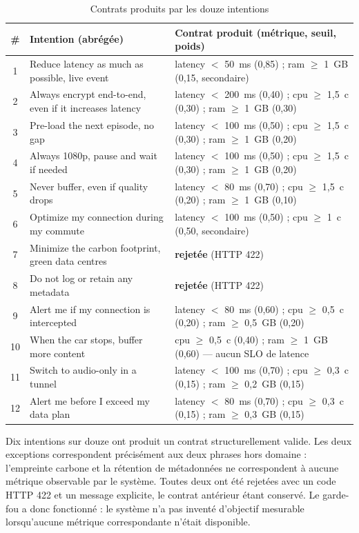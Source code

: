 \begin{table}[H]
    \centering
    \caption{Contrats produits par les douze intentions}
    \label{tab:contrats-intentions}
    \footnotesize
    \begin{tabular}{clp{7.1cm}}
        \toprule
        \textbf{\#} & \textbf{Intention (abrégée)} & \textbf{Contrat produit (métrique, seuil, poids)} \\
        \midrule
        1 & Reduce latency as much as possible, live event & latency $<$ 50~ms (0,85) ; ram $\geq$ 1~GB (0,15, secondaire) \\
        2 & Always encrypt end-to-end, even if it increases latency & latency $<$ 200~ms (0,40) ; cpu $\geq$ 1,5~c (0,30) ; ram $\geq$ 1~GB (0,30) \\
        3 & Pre-load the next episode, no gap & latency $<$ 100~ms (0,50) ; cpu $\geq$ 1,5~c (0,30) ; ram $\geq$ 1~GB (0,20) \\
        4 & Always 1080p, pause and wait if needed & latency $<$ 100~ms (0,50) ; cpu $\geq$ 1,5~c (0,30) ; ram $\geq$ 1~GB (0,20) \\
        5 & Never buffer, even if quality drops & latency $<$ 80~ms (0,70) ; cpu $\geq$ 1,5~c (0,20) ; ram $\geq$ 1~GB (0,10) \\
        6 & Optimize my connection during my commute & latency $<$ 100~ms (0,50) ; cpu $\geq$ 1~c (0,50, secondaire) \\
        7 & Minimize the carbon footprint, green data centres & \textbf{rejetée} (HTTP 422) \\
        8 & Do not log or retain any metadata & \textbf{rejetée} (HTTP 422) \\
        9 & Alert me if my connection is intercepted & latency $<$ 80~ms (0,60) ; cpu $\geq$ 0,5~c (0,20) ; ram $\geq$ 0,5~GB (0,20) \\
        10 & When the car stops, buffer more content & cpu $\geq$ 0,5~c (0,40) ; ram $\geq$ 1~GB (0,60) — aucun SLO de latence \\
        11 & Switch to audio-only in a tunnel & latency $<$ 100~ms (0,70) ; cpu $\geq$ 0,3~c (0,15) ; ram $\geq$ 0,2~GB (0,15) \\
        12 & Alert me before I exceed my data plan & latency $<$ 80~ms (0,70) ; cpu $\geq$ 0,3~c (0,15) ; ram $\geq$ 0,3~GB (0,15) \\
        \bottomrule
    \end{tabular}
\end{table}

Dix intentions sur douze ont produit un contrat structurellement valide. Les deux exceptions correspondent précisément aux deux phrases hors domaine : l'empreinte carbone et la rétention de métadonnées ne correspondent à aucune métrique observable par le système. Toutes deux ont été rejetées avec un code HTTP 422 et un message explicite, le contrat antérieur étant conservé. Le garde-fou a donc fonctionné : le système n'a pas inventé d'objectif mesurable lorsqu'aucune métrique correspondante n'était disponible.

